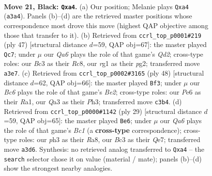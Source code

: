 \documentclass[11pt]{article}
\begin{document}
\clearpage

\begin{figure}[p]\centering
\begin{subfigure}{0.46\textwidth}\centering
\resizebox{\linewidth}{!}{%
\newchessgame
\chessboard[
  setfen={r4rk1/p4p1p/4p3/pP1pQ1P1/P2P2P1/q1b4P/2P5/3K2RR b - - 4 21},
  showmover=false,
  pgfstyle=straightmove, color=movearrow, markmove={a3-a4}
]}
\caption{}
\end{subfigure}\hfill
\begin{subfigure}{0.46\textwidth}\centering
\resizebox{\linewidth}{!}{%
\newchessgame
\chessboard[
  setfen={2r2rk1/p2q2pp/1p2p3/5p2/3PpQ1P/1PP1P3/P1R3P1/R5K1 b - - 2 24},
  showmover=false,
  pgfstyle=straightmove, color=movearrow, markmove={d7-c7}
]}
\caption{}
\end{subfigure}
\\[4pt]
\begin{subfigure}{0.46\textwidth}\centering
\resizebox{\linewidth}{!}{%
\newchessgame
\chessboard[
  setfen={5rk1/5p2/r5bp/q2pQ1p1/2pP4/4P2P/P3BPP1/R4RK1 w - - 3 25},
  showmover=false,
  pgfstyle=straightmove, color=movearrow, markmove={e2-f3}
]}
\caption{}
\end{subfigure}\hfill
\begin{subfigure}{0.46\textwidth}\centering
\resizebox{\linewidth}{!}{%
\newchessgame
\chessboard[
  setfen={r1b2rk1/p3qpp1/1p5p/1B1p4/3Q4/1P2P3/P4PPP/R3K2R b KQ - 0 15},
  showmover=false,
  pgfstyle=straightmove, color=movearrow, markmove={c8-e6}
]}
\caption{}
\end{subfigure}
\caption{\textbf{Move 21, Black: \texttt{Qxa4}.} (a) Our position; Melanie plays \texttt{Qxa4} (\texttt{a3a4}). Panels (b)--(d) are the retrieved master positions whose correspondence most drove this move (highest QAP objective among those that transfer to it). (b) Retrieved from \texttt{ccrl\_top\_p0001\#219} (ply 47) [structural distance $d$=59, QAP obj=67]: the master played \texttt{Qc7}; under $\mu$ our \emph{Qa6} plays the role of that game's \emph{Qd2}; cross-type roles: our \emph{B}c3 as their \emph{R}c8, our \emph{r}g1 as their \emph{p}g2; transferred move \texttt{a3e7}. (c) Retrieved from \texttt{ccrl\_top\_p0002\#3165} (ply 48) [structural distance $d$=62, QAP obj=66]: the master played \texttt{Bf3}; under $\mu$ our \emph{Bc6} plays the role of that game's \emph{Be2}; cross-type roles: our \emph{P}e6 as their \emph{R}a1, our \emph{Q}a3 as their \emph{P}h3; transferred move \texttt{c3b4}. (d) Retrieved from \texttt{ccrl\_top\_p0000\#1142} (ply 29) [structural distance $d$=59, QAP obj=65]: the master played \texttt{Be6}; under $\mu$ our \emph{Qa6} plays the role of that game's \emph{Bc1} (a \textbf{cross-type} correspondence); cross-type roles: our \emph{p}h3 as their \emph{R}a8, our \emph{B}c3 as their \emph{Q}e7; transferred move \texttt{a3d6}. Synthesis: no retrieved analog transferred to \texttt{Qxa4} -- the \texttt{search} selector chose it on value (material / mate); panels (b)--(d) show the strongest nearby analogies.}
\label{fig:thought-m41}
\end{figure}
\end{document}

